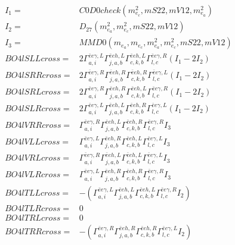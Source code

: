 \documentclass[A4,landscape]{article}
\begin{document}
\begin{align} 
I_1 = & C0D0check(m^2_{e_{{c}}}, mS22, mV12, m^2_{e_{{a}}}) \\ 
I_2 = & D_{27}(m^2_{e_{{a}}}, m^2_{e_{{c}}}, mS22, mV12) \\ 
I_3 = & MMD0(m_{e_{{a}}}, m_{e_{{c}}}, m^2_{e_{{a}}}, m^2_{e_{{c}}}, mS22, mV12) \\ 
  BO4lSLLcross= & 2  \Gamma^{\bar{e}e \gamma ,L}_{a, i} \Gamma^{\bar{e}e h ,L}_{j, a, b} \Gamma^{\bar{e}e h ,L}_{c, k, b} \Gamma^{\bar{e}e \gamma ,R}_{l, c} (I_1 - 2 I_2) \\ 
  BO4lSRRcross= & 2  \Gamma^{\bar{e}e \gamma ,R}_{a, i} \Gamma^{\bar{e}e h ,R}_{j, a, b} \Gamma^{\bar{e}e h ,R}_{c, k, b} \Gamma^{\bar{e}e \gamma ,L}_{l, c} (I_1 - 2 I_2) \\ 
  BO4lSRLcross= & 2  \Gamma^{\bar{e}e \gamma ,R}_{a, i} \Gamma^{\bar{e}e h ,R}_{j, a, b} \Gamma^{\bar{e}e h ,L}_{c, k, b} \Gamma^{\bar{e}e \gamma ,R}_{l, c} (I_1 - 2 I_2) \\ 
  BO4lSLRcross= & 2  \Gamma^{\bar{e}e \gamma ,L}_{a, i} \Gamma^{\bar{e}e h ,L}_{j, a, b} \Gamma^{\bar{e}e h ,R}_{c, k, b} \Gamma^{\bar{e}e \gamma ,L}_{l, c} (I_1 - 2 I_2) \\ 
  BO4lVRRcross= &  \Gamma^{\bar{e}e \gamma ,R}_{a, i} \Gamma^{\bar{e}e h ,L}_{j, a, b} \Gamma^{\bar{e}e h ,R}_{c, k, b} \Gamma^{\bar{e}e \gamma ,R}_{l, c} I_3 \\ 
  BO4lVLLcross= &  \Gamma^{\bar{e}e \gamma ,L}_{a, i} \Gamma^{\bar{e}e h ,R}_{j, a, b} \Gamma^{\bar{e}e h ,L}_{c, k, b} \Gamma^{\bar{e}e \gamma ,L}_{l, c} I_3 \\ 
  BO4lVRLcross= &  \Gamma^{\bar{e}e \gamma ,R}_{a, i} \Gamma^{\bar{e}e h ,L}_{j, a, b} \Gamma^{\bar{e}e h ,L}_{c, k, b} \Gamma^{\bar{e}e \gamma ,L}_{l, c} I_3 \\ 
  BO4lVLRcross= &  \Gamma^{\bar{e}e \gamma ,L}_{a, i} \Gamma^{\bar{e}e h ,R}_{j, a, b} \Gamma^{\bar{e}e h ,R}_{c, k, b} \Gamma^{\bar{e}e \gamma ,R}_{l, c} I_3 \\ 
  BO4lTLLcross= & -( \Gamma^{\bar{e}e \gamma ,L}_{a, i} \Gamma^{\bar{e}e h ,L}_{j, a, b} \Gamma^{\bar{e}e h ,L}_{c, k, b} \Gamma^{\bar{e}e \gamma ,R}_{l, c} I_2) \\ 
  BO4lTLRcross= & 0 \\ 
  BO4lTRLcross= & 0 \\ 
  BO4lTRRcross= & -( \Gamma^{\bar{e}e \gamma ,R}_{a, i} \Gamma^{\bar{e}e h ,R}_{j, a, b} \Gamma^{\bar{e}e h ,R}_{c, k, b} \Gamma^{\bar{e}e \gamma ,L}_{l, c} I_2) \\ 
\end{align} 
\end{document}
